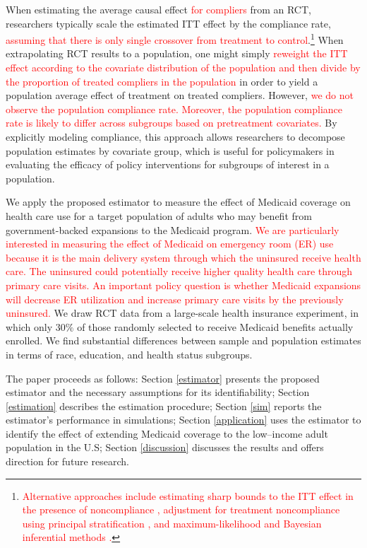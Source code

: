 \documentclass[hidelinks,12pt]{article}
\begin{document}
When estimating the average causal effect \textcolor{red}{for compliers} from an RCT, researchers typically scale the estimated ITT effect by the compliance rate, \textcolor{red}{assuming that there is only single crossover from treatment to control}.\footnote{\textcolor{red}{Alternative approaches include estimating sharp bounds to the ITT effect in the presence of noncompliance \citep{balke1997bounds,imai2013experimental}, adjustment for treatment noncompliance using principal stratification \citep{frangakis2002principal,frumento2012evaluating}, and maximum-likelihood and Bayesian inferential methods \citep{yau2001inference}.}} When extrapolating RCT results to a population, one might simply \textcolor{red}{reweight the ITT effect according to the covariate distribution of the population and then divide by the proportion of treated compliers in the population} in order to yield a population average effect of treatment on treated compliers. However, \textcolor{red}{we do not observe the population compliance rate. Moreover, the population compliance rate is likely to differ across subgroups based on pretreatment covariates.} By explicitly modeling compliance, this approach allows researchers to decompose population estimates by covariate group, which is useful for policymakers in evaluating the efficacy of policy interventions for subgroups of interest in a population. 

We apply the proposed estimator to measure the effect of Medicaid coverage on health care use for a target population of adults who may benefit from government-backed expansions to the Medicaid program. \textcolor{red}{We are particularly interested in measuring the effect of Medicaid on emergency room (ER) use because it is the main delivery system through which the uninsured receive health care. The uninsured could potentially receive higher quality health care through primary care visits. An important policy question is whether Medicaid expansions will decrease ER utilization and increase primary care visits by the previously uninsured.} We draw RCT data from a large-scale health insurance experiment, in which only $30\%$ of those randomly selected to receive Medicaid benefits actually enrolled. We find substantial differences between sample and population estimates in terms of race, education, and health status subgroups.

The paper proceeds as follows: Section \ref{estimator} presents the proposed estimator and the necessary assumptions for its identifiability; Section \ref{estimation} describes the estimation procedure; Section \ref{sim} reports the estimator's performance in simulations; Section \ref{application} uses the estimator to identify the effect of extending Medicaid coverage to the low--income adult population in the U.S; Section \ref{discussion} discusses the results and offers direction for future research. 
\end{document}
